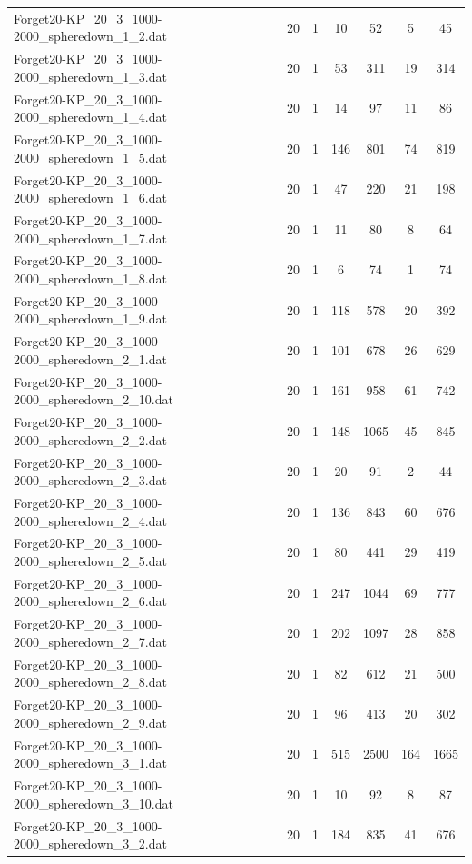 \begin{table}[!ht]
\begin{tabular}{lcccccc}
Forget20-KP\_20\_3\_1000-2000\_spheredown\_1\_2.dat & 20 & 1 & 10 & 52 & 5 & 45 \\
Forget20-KP\_20\_3\_1000-2000\_spheredown\_1\_3.dat & 20 & 1 & 53 & 311 & 19 & 314 \\
Forget20-KP\_20\_3\_1000-2000\_spheredown\_1\_4.dat & 20 & 1 & 14 & 97 & 11 & 86 \\
Forget20-KP\_20\_3\_1000-2000\_spheredown\_1\_5.dat & 20 & 1 & 146 & 801 & 74 & 819 \\
Forget20-KP\_20\_3\_1000-2000\_spheredown\_1\_6.dat & 20 & 1 & 47 & 220 & 21 & 198 \\
Forget20-KP\_20\_3\_1000-2000\_spheredown\_1\_7.dat & 20 & 1 & 11 & 80 & 8 & 64 \\
Forget20-KP\_20\_3\_1000-2000\_spheredown\_1\_8.dat & 20 & 1 & 6 & 74 & 1 & 74 \\
Forget20-KP\_20\_3\_1000-2000\_spheredown\_1\_9.dat & 20 & 1 & 118 & 578 & 20 & 392 \\
Forget20-KP\_20\_3\_1000-2000\_spheredown\_2\_1.dat & 20 & 1 & 101 & 678 & 26 & 629 \\
Forget20-KP\_20\_3\_1000-2000\_spheredown\_2\_10.dat & 20 & 1 & 161 & 958 & 61 & 742 \\
Forget20-KP\_20\_3\_1000-2000\_spheredown\_2\_2.dat & 20 & 1 & 148 & 1065 & 45 & 845 \\
Forget20-KP\_20\_3\_1000-2000\_spheredown\_2\_3.dat & 20 & 1 & 20 & 91 & 2 & 44 \\
Forget20-KP\_20\_3\_1000-2000\_spheredown\_2\_4.dat & 20 & 1 & 136 & 843 & 60 & 676 \\
Forget20-KP\_20\_3\_1000-2000\_spheredown\_2\_5.dat & 20 & 1 & 80 & 441 & 29 & 419 \\
Forget20-KP\_20\_3\_1000-2000\_spheredown\_2\_6.dat & 20 & 1 & 247 & 1044 & 69 & 777 \\
Forget20-KP\_20\_3\_1000-2000\_spheredown\_2\_7.dat & 20 & 1 & 202 & 1097 & 28 & 858 \\
Forget20-KP\_20\_3\_1000-2000\_spheredown\_2\_8.dat & 20 & 1 & 82 & 612 & 21 & 500 \\
Forget20-KP\_20\_3\_1000-2000\_spheredown\_2\_9.dat & 20 & 1 & 96 & 413 & 20 & 302 \\
Forget20-KP\_20\_3\_1000-2000\_spheredown\_3\_1.dat & 20 & 1 & 515 & 2500 & 164 & 1665 \\
Forget20-KP\_20\_3\_1000-2000\_spheredown\_3\_10.dat & 20 & 1 & 10 & 92 & 8 & 87 \\
Forget20-KP\_20\_3\_1000-2000\_spheredown\_3\_2.dat & 20 & 1 & 184 & 835 & 41 & 676 \\

\end{tabular}
\end{table}
